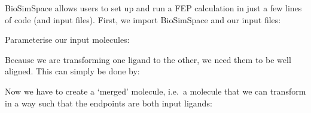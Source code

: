 BioSimSpace allows users to set up and run a FEP calculation in just a
few lines of code (and input files). First, we import BioSimSpace and
our input files:

\begin{Shaded}
\begin{Highlighting}[]
\OperatorTok{=}\NormalTok{)[}\NormalTok{]}
\OperatorTok{=}\NormalTok{)[}\NormalTok{]}
\OperatorTok{=}\NormalTok{)[}\NormalTok{]}
\end{Highlighting}
\end{Shaded}

Parameterise our input molecules:

\begin{Shaded}
\begin{Highlighting}[]
\OperatorTok{=}
\OperatorTok{=}
\OperatorTok{=}
\end{Highlighting}
\end{Shaded}

Because we are transforming one ligand to the other, we need them to be
well aligned. This can simply be done by:

\begin{Shaded}
\begin{Highlighting}[]
\OperatorTok{=}
\OperatorTok{=}
\end{Highlighting}
\end{Shaded}

Now we have to create a `merged' molecule, i.e.~a molecule that we can
transform in a way such that the endpoints are both input ligands:

\begin{Shaded}
\begin{Highlighting}[]
\OperatorTok{=}
\end{Highlighting}
\end{Shaded}

